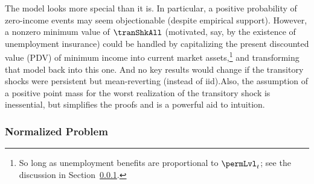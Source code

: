 \documentclass[BufferStockTheory]{subfiles}
\begin{document}
\hypertarget{PDV}{}

The model looks more special than it is.
In particular, a positive probability of zero-income events may seem objectionable (despite empirical support).
However, a nonzero minimum value of $\tranShkAll$ (motivated, say, by the existence of unemployment insurance) could be handled by capitalizing the present discounted value (PDV) of minimum income into current market assets,\footnote{So long as unemployment benefits are proportional to $\permLvl_{t}$; see the discussion in Section~\ref{subsubsec:ratio}.} and transforming that model back into this one.
And no key results would change if the transitory shocks were persistent but mean-reverting (instead of iid).\@ Also, the assumption of a positive point mass for the worst realization of the transitory shock is inessential, but simplifies the proofs and is a powerful aid to intuition.


\begin{comment}
Following footnotes and text were removed from the discussion above


\footnote{\cite{rabaultBorrowing} and~\cite{lsIncFluct} analyze cases where the shock processes have unbounded support.} 

and when $\permShkIndMin=\permShkIndMax=1$ the model becomes the degenerate case with no permanent shocks
\end{comment}

\hypertarget{The-Problem-Can-Be-Rewritten-in-Ratio-Form}{}
\hypertarget{The-Problem-Can-Be-Normalized-By-Permanent-Income}{}
\subsubsection{Normalized Problem}\label{subsubsec:ratio}
\end{document}
